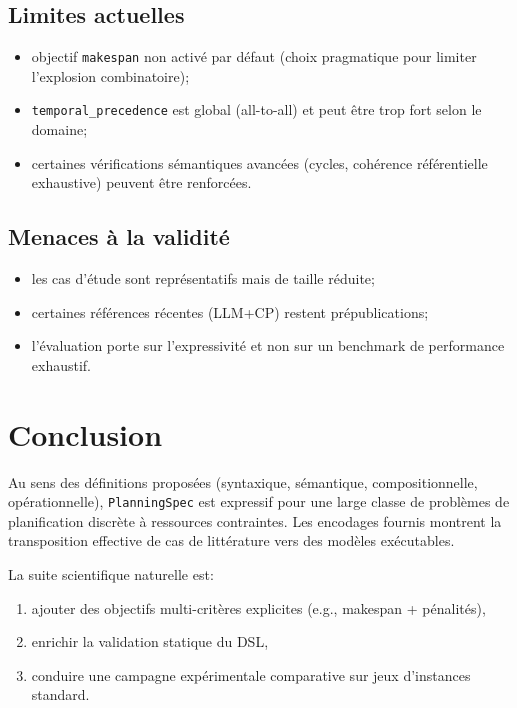 \documentclass[12pt,a4paper]{article}
\begin{document}
\subsection{Limites actuelles}
\begin{itemize}
  \item objectif \texttt{makespan} non activé par défaut (choix pragmatique pour limiter l'explosion combinatoire);
  \item \texttt{temporal\_precedence} est global (all-to-all) et peut être trop fort selon le domaine;
  \item certaines vérifications sémantiques avancées (cycles, cohérence référentielle exhaustive) peuvent être renforcées.
\end{itemize}

\subsection{Menaces à la validité}
\begin{itemize}
  \item les cas d'étude sont représentatifs mais de taille réduite;
  \item certaines références récentes (LLM+CP) restent prépublications;
  \item l'évaluation porte sur l'expressivité et non sur un benchmark de performance exhaustif.
\end{itemize}

\section{Conclusion}
Au sens des définitions proposées (syntaxique, sémantique, compositionnelle, opérationnelle), \texttt{PlanningSpec} est expressif pour une large classe de problèmes de planification discrète à ressources contraintes. Les encodages fournis montrent la transposition effective de cas de littérature vers des modèles exécutables.

La suite scientifique naturelle est:
\begin{enumerate}
  \item ajouter des objectifs multi-critères explicites (e.g., makespan + pénalités),
  \item enrichir la validation statique du DSL,
  \item conduire une campagne expérimentale comparative sur jeux d'instances standard.
\end{enumerate}



\end{document}
